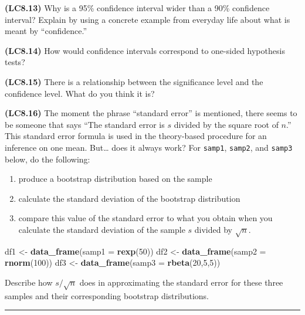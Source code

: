 \documentclass[]{tufte-book}
\newenvironment{Shaded}{\begin{snugshade}}{\end{snugshade}}
\newcommand{\KeywordTok}[1]{\textcolor[rgb]{0.13,0.29,0.53}{\textbf{{#1}}}}
\newcommand{\DataTypeTok}[1]{\textcolor[rgb]{0.13,0.29,0.53}{{#1}}}
\newcommand{\DecValTok}[1]{\textcolor[rgb]{0.00,0.00,0.81}{{#1}}}
\newcommand{\StringTok}[1]{\textcolor[rgb]{0.31,0.60,0.02}{{#1}}}
\newcommand{\NormalTok}[1]{{#1}}
\let\oldrule=\rule
\renewcommand{\rule}[1]{\oldrule{\linewidth}}
\providecommand{\tightlist}{%
  \setlength{\itemsep}{0pt}\setlength{\parskip}{0pt}}
\begin{document}
\textbf{(LC8.13)} Why is a 95\% confidence interval wider than a 90\%
confidence interval? Explain by using a concrete example from everyday
life about what is meant by ``confidence.''

\textbf{(LC8.14)} How would confidence intervals correspond to one-sided
hypothesis tests?

\textbf{(LC8.15)} There is a relationship between the significance level
and the confidence level. What do you think it is?

\textbf{(LC8.16)} The moment the phrase ``standard error'' is mentioned,
there seems to be someone that says ``The standard error is \(s\)
divided by the square root of \(n\).'' This standard error formula is
used in the theory-based procedure for an inference on one mean.
But\ldots{} does it always work? For \texttt{samp1}, \texttt{samp2}, and
\texttt{samp3} below, do the following:

\begin{enumerate}
\def\labelenumi{\arabic{enumi}.}
\tightlist
\item
  produce a bootstrap distribution based on the sample
\item
  calculate the standard deviation of the bootstrap distribution
\item
  compare this value of the standard error to what you obtain when you
  calculate the standard deviation of the sample \(s\) divided by
  \(\sqrt{n}\).
\end{enumerate}

\begin{Shaded}
\begin{Highlighting}[]
\NormalTok{df1 <-}\StringTok{ }\KeywordTok{data_frame}\NormalTok{(}\DataTypeTok{samp1 =} \KeywordTok{rexp}\NormalTok{(}\DecValTok{50}\NormalTok{))}
\NormalTok{df2 <-}\StringTok{ }\KeywordTok{data_frame}\NormalTok{(}\DataTypeTok{samp2 =} \KeywordTok{rnorm}\NormalTok{(}\DecValTok{100}\NormalTok{))}
\NormalTok{df3 <-}\StringTok{ }\KeywordTok{data_frame}\NormalTok{(}\DataTypeTok{samp3 =} \KeywordTok{rbeta}\NormalTok{(}\DecValTok{20}\NormalTok{,}\DecValTok{5}\NormalTok{,}\DecValTok{5}\NormalTok{))}
\end{Highlighting}
\end{Shaded}

Describe how \(s / \sqrt{n}\) does in approximating the standard error
for these three samples and their corresponding bootstrap distributions.

\begin{center}\rule{0.5\linewidth}{\linethickness}\end{center}
\end{document}
